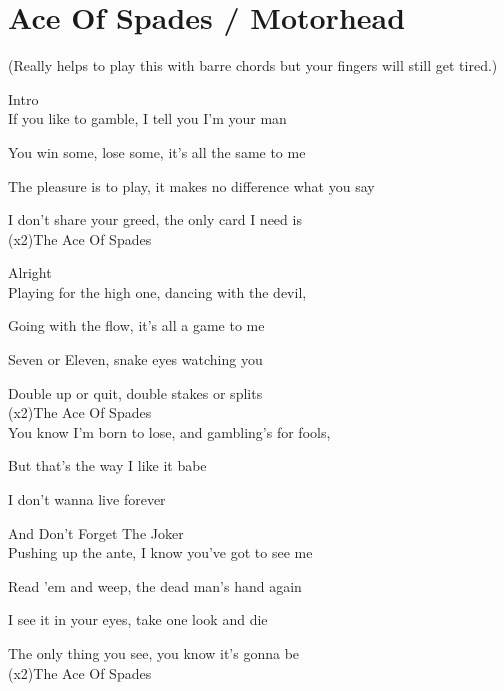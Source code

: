 \section{Ace Of Spades / Motorhead}\label{sec:ace_of_spades}
{\small (Really helps to play this with barre chords but your fingers will still get tired.)}
\Bmajor
\Cmajor
\Dmajor
\Emajor
\Gmajor

Intro\\

If you like to gamble, I tell you I'm your man

You win some, lose some, it's all the same to me

The pleasure is to play, it makes no difference what you say

I don't share your greed, the only card I need is\\

(x2)The Ace Of Spades

Alright\\

Playing for the high one, dancing with the devil,

Going with the flow, it's all a game to me

Seven or Eleven, snake eyes watching you

Double up or quit, double stakes or splits\\

(x2)The Ace Of Spades\\

You know I'm born to lose, and gambling's for fools,

But that's the way I like it babe

I don't wanna live forever \hrulefill{}\hrulefill{}\hrulefill{}\hrulefill{}\hrulefill

And Don't Forget The Joker\\

Pushing up the ante, I know you've got to see me

Read 'em and weep, the dead man's hand again

I see it in your eyes, take one look and die

The only thing you see, you know it's gonna be\\

(x2)The Ace Of Spades


